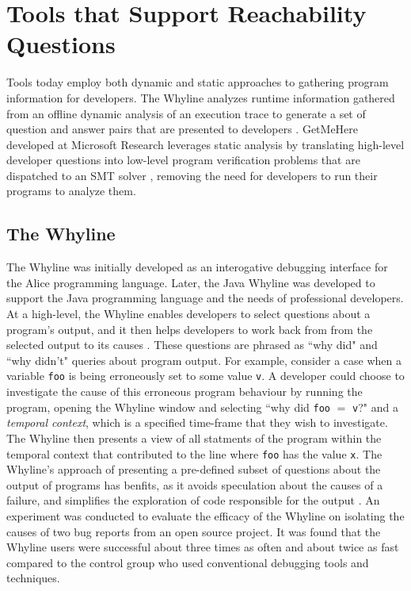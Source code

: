\section{Tools that Support Reachability Questions}
\label{sec:ToolsSupportReachabilityQuestions}

\noindent Tools today employ both dynamic and static approaches to gathering
program information for developers.
The Whyline analyzes runtime information gathered from an offline dynamic
analysis of an execution trace to generate a set of question and answer pairs
that are presented to developers \cite{ko-2004-whyline}.
GetMeHere developed at Microsoft Research leverages static analysis by
translating high-level developer questions into low-level program verification 
problems that are dispatched to an \ac{SMT} solver \cite{barnett-2014-get}, 
removing the need for developers to run their programs to analyze them.

\subsection{The Whyline}
\label{subsec:TheWhyline}

\par The Whyline was initially developed as an interogative debugging interface
for the Alice programming language. Later, the Java Whyline was developed to 
support the Java programming language and the needs of professional developers.
At a high-level, the Whyline enables developers to select questions about a
program's output, and it then helps developers to work back from from the 
selected output to its causes \cite{ko-2009-java-whyline}.
These questions are phrased as ``why did" and ``why didn't"
queries about program output.
For example, consider a case when a variable \texttt{foo} is being erroneously 
set to some value \texttt{v}.
A developer could choose to investigate the cause of this erroneous program
behaviour by running the program, opening the Whyline window and selecting
``why did \texttt{foo} $=$ \texttt{v}?" and a \emph{temporal context}, which is
a specified time-frame that they wish to investigate.
The Whyline then presents a view of all statments of the program within the
temporal context that contributed to the line where \texttt{foo} has the value
\texttt{x}. 
The Whyline's approach of presenting a pre-defined subset of questions about the 
output of programs has benfits, as it avoids speculation about the causes of
a failure, and simplifies the exploration of code responsible for the output
\cite{ko-2009-java-whyline}.
An experiment was conducted to evaluate the efficacy of the Whyline on 
isolating the causes of two bug reports from an open source project.
It was found that the Whyline users were successful about three times as often
and about twice as fast compared to the control group who used conventional
debugging tools and techniques.

